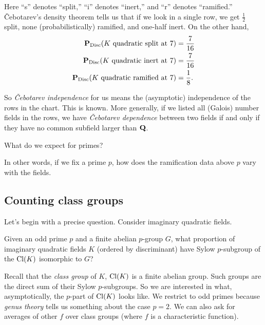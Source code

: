 Here ``s'' denotes ``split,'' ``i'' denotes ``inert,'' and ``r'' denotes ``ramified.'' 
\v Cebotarev's density theorem tells us that if we look in a single row, 
we get $\frac 1 2$ split, none (probabilistically) ramified, and one-half 
inert. On the other hand, 
\begin{align*}
  \mathbf{P}_{\operatorname{Disc}}(\text{$K$ quadratic split at $7$}) 
    &= \frac{7}{16} \\
  \mathbf{P}_{\operatorname{Disc}}(\text{$K$ quadratic inert at $7$}) 
    &= \frac{7}{16} \\
  \mathbf{P}_{\operatorname{Disc}}(\text{$K$ quadratic ramified at $7$}) 
    &= \frac{1}{8} .
\end{align*}

So \emph{\v Cebotarev independence} for us means the (asymptotic) independence 
of the rows in the chart. This is known. More generally, if we listed all 
(Galois) number fields in the rows, we have \emph{\v Cebotarev dependence} 
between two fields if and only if they have no common subfield larger than 
$\mathbf{Q}$. 

\begin{question}
What do we expect for primes?
\end{question}

In other words, if we fix a prime $p$, how does the ramification data above $p$ 
vary with the fields. 





\subsection{Counting class groups}

Let's begin with a precise question. Consider imaginary quadratic fields. 

\begin{question}
Given an odd prime $p$ and a finite abelian $p$-group $G$, what proportion of 
imaginary quadratic fields $K$ (ordered by discriminant) have Sylow 
$p$-subgroup of the $\operatorname{Cl}(K)$ isomorphic to $G$?
\end{question}

Recall that the \emph{class group} of $K$, $\operatorname{Cl}(K)$ is a finite abelian 
group. Such groups are the direct sum of their Sylow $p$-subgroups. So we are 
interested in what, asymptotically, the $p$-part of $\operatorname{Cl}(K)$ looks like. We 
restrict to odd primes because \emph{genus theory} tells us something about the 
case $p=2$. We can also ask for averages of other $f$ over class groups (where 
$f$ is a characteristic function). 

